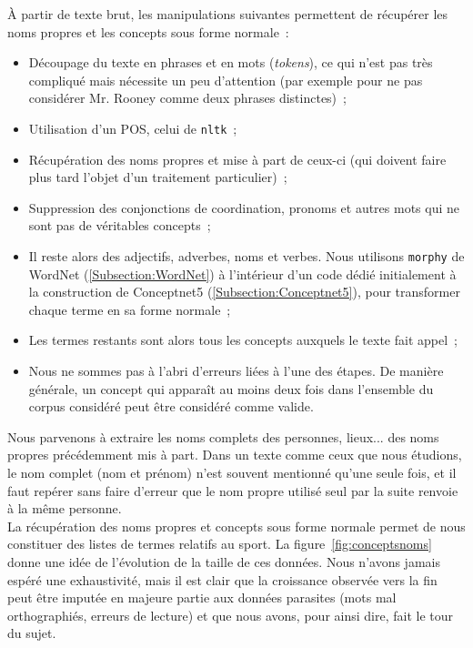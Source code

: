 \documentclass[a4paper, 12pt]{article}
\newcommand{\pyt}[1]{\texttt{#1}}%
\newcommand{\ang}[1]{\textit{#1}}%
\begin{document}
\`A partir de texte brut, les manipulations suivantes permettent de récupérer les noms propres et les concepts sous forme normale~:
\begin{itemize}
 \item Découpage du texte en phrases et en mots (\ang{tokens}), ce qui n'est pas très compliqué mais nécessite un peu d'attention (par exemple pour ne pas considérer Mr. Rooney comme deux phrases distinctes)~;
 \item Utilisation d'un POS, celui de \pyt{nltk}~;
 \item Récupération des noms propres et mise à part de ceux-ci (qui doivent faire plus tard l'objet d'un traitement particulier)~;
 \item Suppression des conjonctions de coordination, pronoms et autres mots qui ne sont pas de véritables concepts~;
 \item Il reste alors des adjectifs, adverbes, noms et verbes. Nous utilisons \pyt{morphy} de WordNet (\ref{Subsection:WordNet}) à l'intérieur d'un code dédié initialement à la construction de Conceptnet5 (\ref{Subsection:Conceptnet5}), pour transformer chaque terme en sa forme normale~;
 \item Les termes restants sont alors tous les concepts auxquels le texte fait appel~;
 \item Nous ne sommes pas à l'abri d'erreurs liées à l'une des étapes. De manière générale, un concept qui apparaît au moins deux fois dans l'ensemble du corpus considéré peut être considéré comme valide.
\end{itemize}

Nous parvenons à extraire les noms complets des personnes, lieux... des noms propres précédemment mis à part. Dans un texte comme ceux que nous étudions, le nom complet (nom et prénom) n'est souvent mentionné qu'une seule fois, et il faut repérer sans faire d'erreur que le nom propre utilisé seul par la suite renvoie à la même personne.\\

La récupération des noms propres et concepts sous forme normale permet de nous constituer des listes de termes relatifs au sport. La figure~\ref{fig:conceptsnoms} donne une idée de l'évolution de la taille de ces données. Nous n'avons jamais espéré une exhaustivité, mais il est clair que la croissance observée vers la fin peut être imputée en majeure partie aux données parasites (mots mal orthographiés, erreurs de lecture) et que nous avons, pour ainsi dire, fait le tour du sujet.
\end{document}
